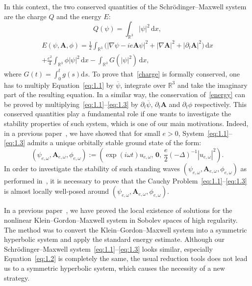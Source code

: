 \documentclass[10pt]{amsart}
\theoremstyle{definition}\newtheorem{defi}[theo]{Definition}\newtheorem{rema}[theo]{Remark}\newtheorem{exam}[theo]{Example}\newtheorem{exem}[theo]{Example}\newtheorem{nota}[theo]{Notation}
\newcommand{\BA}{\mathbf{A}}
\newcommand{\R}{\mathbb{R}}
\newcommand*{\dd}{\mathrm{d}}
\newcommand*{\ds}{\dd s}
\newcommand*{\dx}{\dd x}
\begin{document}
In this context, the two conserved quantities of the Schr\"odinger--Maxwell system are the charge $Q$ and the energy $E$:
\begin{equation}\label{charge}
Q(\psi)=\int_{\R^3} |\psi|^2 \,\dx,
\end{equation}
\vspace{-2\belowdisplayskip}
\begin{multline}\label{energy}
E(\psi,\BA,\phi)= \frac{1}{2}\int_{\R^3}
\big(|\nabla \psi -ie\BA \psi|^2+|\nabla \BA|^2 +|\partial_t \BA|^2\big) \,\dx\\
+\frac{e^2}{4} \int_{\R^3} \phi |\psi|^2 \,\dx -\int_{\R^3}G(|\psi|^2) \,\dx,
\end{multline}
where $G(t)=\int_0^t g(s)\ds$. To prove that~\eqref{charge} is formally conserved, one has to multiply Equation~\eqref{eq:1.1} by $\overline{\psi}$, integrate over $\R^3$ and take the imaginary part of the resulting equation. In a similar way, the conservation of~\eqref{energy} can be proved by multiplying~\eqref{eq:1.1}--\eqref{eq:1.3} by $\partial_t \overline{\psi}$, $\partial_t \BA$ and $\partial_t \phi$ respectively. This conserved quantities play a fundamental role if one wants to investigate the stability properties of such system, which is one of our main motivations. Indeed, in a previous paper~\cite{CW2}, we have showed that for small $e>0$, System~\eqref{eq:1.1}--\eqref{eq:1.3} admits a unique orbitally stable ground state of the form:
\begin{equation}\label{stand}
(\psi_{e,\omega}, \BA_{e,\omega}, \phi_{e,\omega}) := \left(\exp(i\omega t)u_{e,\omega}, \, \mathbf{0}, \,
\frac{e}{2} (-\Delta)^{-1} | u_{e,\omega}|^2 \right).
\end{equation}
In order to investigate the stability of such standing waves $(\psi_{e,\omega}, \BA_{e,\omega}, \phi_{e,\omega})$ as performed in~\cite{CW2}, it is necessary to prove that the Cauchy Problem~\eqref{eq:1.1}--\eqref{eq:1.3} is almost locally well-posed around $(\psi_{e,\omega}, \BA_{e,\omega}, \phi_{e,\omega})$.

In a previous paper~\cite{CW1}, we have proved the local existence of solutions for the nonlinear Klein--Gordon--Maxwell system in Sobolev spaces of high regularity. The method was to convert the Klein--Gordon--Maxwell system into a symmetric hyperbolic system and apply the standard energy estimate. Although our Schr\"odinger--Maxwell system~\eqref{eq:1.1}--\eqref{eq:1.3} looks similar, especially Equation~\eqref{eq:1.2} is completely the same, the usual reduction tools does not lead us to a symmetric hyperbolic system, which causes the necessity of a new strategy.
\end{document}
